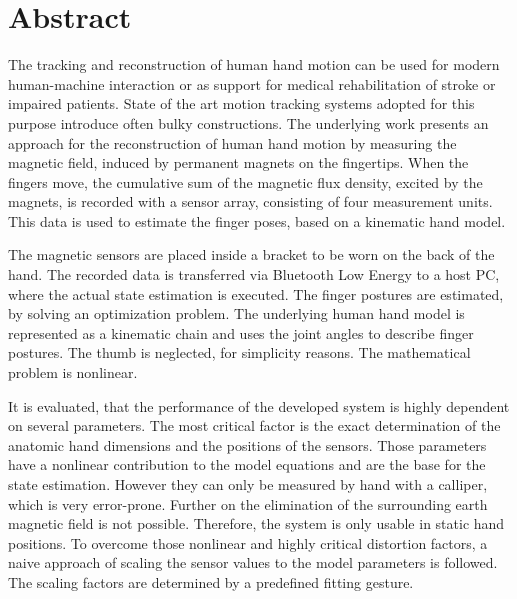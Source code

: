 
\chapter*{Abstract}

The tracking and reconstruction of human hand motion can be used for modern human-machine interaction or as support for medical rehabilitation of stroke or impaired patients. State of the art motion tracking systems adopted for this purpose introduce often bulky constructions.  
The underlying work presents an approach for the reconstruction of human hand motion by measuring the magnetic field, induced by permanent magnets on the fingertips. When the fingers move, the cumulative sum of the magnetic flux density, excited by the magnets, is recorded with a sensor array, consisting of four measurement units. This data is used to estimate the finger poses, based on a kinematic hand model. 

The magnetic sensors are placed inside a bracket to be worn on the back of the hand. The recorded data is transferred via Bluetooth Low Energy to a host PC, where the actual state estimation is executed. The finger postures are estimated, by solving an optimization problem. The underlying human hand model is represented as a kinematic chain and uses the joint angles to describe finger postures. The thumb is neglected, for simplicity reasons. The mathematical problem is nonlinear. 

It is evaluated, that the performance of the developed system is highly dependent on several parameters. The most critical factor is the exact determination of the anatomic hand dimensions and the positions of the sensors. Those parameters have a nonlinear contribution to the model equations and are the base for the state estimation. However they can only be measured by hand with a calliper, which is very error-prone. Further on the elimination of the surrounding earth magnetic field is not possible. Therefore, the system is only usable in static hand positions. To overcome those nonlinear and highly critical distortion factors, a naive approach of scaling the sensor values to the model parameters is followed. The scaling factors are determined by a predefined fitting gesture.

